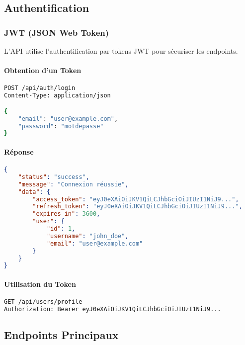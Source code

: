 \subsection{Authentification}

\subsubsection{JWT (JSON Web Token)}

L'API utilise l'authentification par tokens JWT pour sécuriser les endpoints.

\paragraph{Obtention d'un Token}

\begin{lstlisting}[language=bash]
POST /api/auth/login
Content-Type: application/json

{
    "email": "user@example.com",
    "password": "motdepasse"
}
\end{lstlisting}

\paragraph{Réponse}

\begin{lstlisting}[language=json]
{
    "status": "success",
    "message": "Connexion réussie",
    "data": {
        "access_token": "eyJ0eXAiOiJKV1QiLCJhbGciOiJIUzI1NiJ9...",
        "refresh_token": "eyJ0eXAiOiJKV1QiLCJhbGciOiJIUzI1NiJ9...",
        "expires_in": 3600,
        "user": {
            "id": 1,
            "username": "john_doe",
            "email": "user@example.com"
        }
    }
}
\end{lstlisting}

\paragraph{Utilisation du Token}

\begin{lstlisting}[language=bash]
GET /api/users/profile
Authorization: Bearer eyJ0eXAiOiJKV1QiLCJhbGciOiJIUzI1NiJ9...
\end{lstlisting}

\subsection{Endpoints Principaux}

